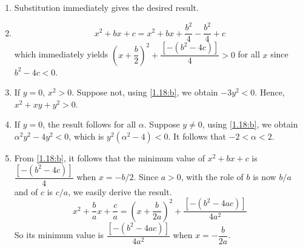 \begin{solution}
  \begin{enumerate}[label=(\alph*)]
    \item Substitution immediately gives the desired result.
    \item
    \begin{equation*}
      x^2 + bx + c = x^2 + bx + \frac{b^2}{4}
      - \frac{b^2}{4} + c
    \end{equation*}
    which immediately yields
    $\left(x + \dfrac{b}{2}\right)^2
    + \dfrac{[-(b^2 - 4c)]}{4} > 0$ for all $x$ since
    $b^2 - 4c < 0$.
    \item If $y = 0$, $x^2>0$. Suppose not,
    using \ref{1.18:b}, we obtain
    $-3y^2 < 0$. Hence, $x^2 + xy + y^2 > 0$.
    \item If $y = 0$, the result follows for all
    $\alpha$. Suppose $y\neq0$,
    using \ref{1.18:b}, we obtain $\alpha^2y^2
    - 4y^2 < 0$, which is $y^2(\alpha^2 - 4) < 0$.
    It follows that $-2 < \alpha < 2$.
    \item From \ref{1.18:b}, it follows that
    the minimum value of $x^2 + bx + c$ is
    $\dfrac{[-(b^2 - 4c)]}{4}$ when $x = -b/2$.
    Since $a > 0$, with the role of $b$ is now
    $b/a$ and of $c$ is $c/a$, we easily
    derive the result.
    \begin{equation*}
      x^2 + \frac{b}{a}x + \frac{c}{a} =
      \left(x + \frac{b}{2a}\right)^2
      + \frac{[-(b^2 - 4ac)]}{4a^2}
    \end{equation*}
    So its minimum value is $\dfrac{[-(b^2 - 4ac)]}{4a^2}$
    when $x = -\dfrac{b}{2a}$.
  \end{enumerate}
\end{solution}


